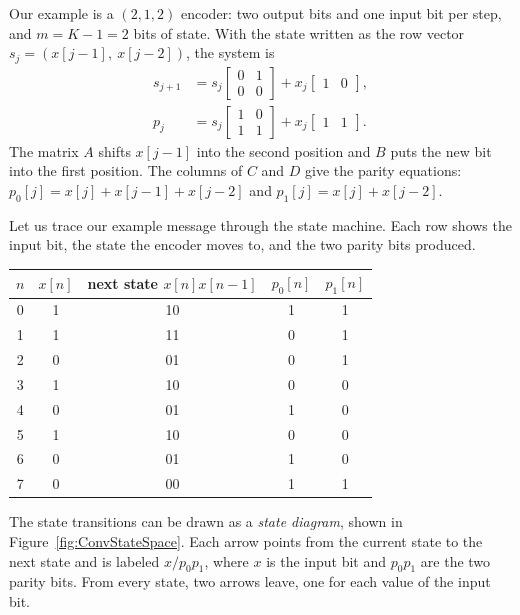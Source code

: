 Our example is a \((2, 1, 2)\) encoder: two output bits and one input bit per step, and \(m = K - 1 = 2\) bits of state. With the state written as the row vector \(s_j = (x[j-1],\ x[j-2])\), the system is
\begin{align*}
s_{j+1} &= s_j \begin{bmatrix}
    0 & 1 \\
    0 & 0
\end{bmatrix} + x_j  \begin{bmatrix}
    1 & 0
\end{bmatrix}, \\
p_{j} &= s_j \begin{bmatrix}
    1 & 0 \\
    1 & 1
\end{bmatrix} + x_j  \begin{bmatrix}
    1 & 1
\end{bmatrix}.
\end{align*}
The matrix \(A\) shifts \(x[j-1]\) into the second position and \(B\) puts the new bit into the first position. The columns of \(C\) and \(D\) give the parity equations: \(p_0[j] = x[j] + x[j-1] + x[j-2]\) and \(p_1[j] = x[j] + x[j-2]\).

Let us trace our example message through the state machine. Each row shows the input bit, the state the encoder moves to, and the two parity bits produced.
\begin{center}
\begin{tabular}{|c|c|c|c|c|}
\hline
\(n\) & \(x[n]\) & next state \(x[n]x[n-1]\) & \(p_0[n]\) & \(p_1[n]\) \\ \hline
0 & 1 & 10 & 1 & 1 \\
1 & 1 & 11 & 0 & 1 \\
2 & 0 & 01 & 0 & 1 \\
3 & 1 & 10 & 0 & 0 \\
4 & 0 & 01 & 1 & 0 \\
5 & 1 & 10 & 0 & 0 \\
6 & 0 & 01 & 1 & 0 \\
7 & 0 & 00 & 1 & 1 \\
\hline
\end{tabular}
\end{center}

The state transitions can be drawn as a \emph{state diagram}, shown in Figure~\ref{fig:ConvStateSpace}. Each arrow points from the current state to the next state and is labeled \(x/p_0p_1\), where \(x\) is the input bit and \(p_0p_1\) are the two parity bits. From every state, two arrows leave, one for each value of the input bit.

